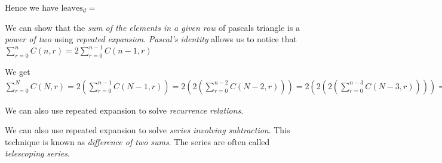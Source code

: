 Hence we have $\text{leaves}_d = $


We can show that the \textit{sum of the elements in a given row} of pascals triangle is a \textit{power of two}
using \textit{repeated expansion}. \textit{Pascal's identity} allows us to
notice that $\sum^{n}_{r=0} C(n,r) = 2 \sum^{n-1}_{r=0} C(n-1, r)$

We get $\sum^{N}_{r=0} C(N,r) 
= 2 (\sum^{n-1}_{r=0} C(N-1, r))
= 2 (2(\sum^{n-2}_{r=0} C(N-2, r)))
= 2 (2(2(\sum^{n-3}_{r=0} C(N-3, r))))
= \dotsm
= 2 (2(2[ \dotsm 2(\sum^{1}_{r=0} C(1, r))] ))
= 2^{N}
$


We can also use repeated expansion to solve \textit{recurrence relations}.

We can also use repeated expansion to solve \textit{series involving subtraction}.
This technique is known as \textit{difference of two sums}. 
The series are often called \textit{telescoping series}. 